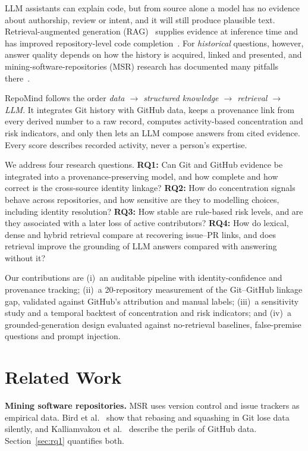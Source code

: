 \documentclass[conference]{IEEEtran}
\newcommand{\res}[1]{#1}
\begin{document}
LLM assistants can explain code, but from source alone a model has no evidence about authorship, review or intent, and it will still produce plausible text. Retrieval-augmented generation (RAG)~\cite{lewis2020rag} supplies evidence at inference time and has improved repository-level code completion~\cite{zhang2023repocoder}. For \emph{historical} questions, however, answer quality depends on how the history is acquired, linked and presented, and mining-software-repositories (MSR) research has documented many pitfalls there~\cite{bird2009perils,kalliamvakou2014promises}.

RepoMind follows the order \emph{data $\rightarrow$ structured knowledge $\rightarrow$ retrieval $\rightarrow$ LLM}. It integrates Git history with GitHub data, keeps a provenance link from every derived number to a raw record, computes activity-based concentration and risk indicators, and only then lets an LLM compose answers from cited evidence. Every score describes recorded activity, never a person's expertise.

We address four research questions. \textbf{RQ1:} Can Git and GitHub evidence be integrated into a provenance-preserving model, and how complete and how correct is the cross-source identity linkage? \textbf{RQ2:} How do concentration signals behave across repositories, and how sensitive are they to modelling choices, including identity resolution? \textbf{RQ3:} How stable are rule-based risk levels, and are they associated with a later loss of active contributors? \textbf{RQ4:} How do lexical, dense and hybrid retrieval compare at recovering issue--PR links, and does retrieval improve the grounding of LLM answers compared with answering without it?

Our contributions are (i)~an auditable pipeline with identity-confidence and provenance tracking; (ii)~a \res{20}-repository measurement of the Git--GitHub linkage gap, validated against GitHub's attribution and manual labels; (iii)~a sensitivity study and a temporal backtest of concentration and risk indicators; and (iv)~a grounded-generation design evaluated against no-retrieval baselines, false-premise questions and prompt injection.

\section{Related Work}
\textbf{Mining software repositories.} MSR uses version control and issue trackers as empirical data. Bird et al.~\cite{bird2009perils} show that rebasing and squashing in Git lose data silently, and Kalliamvakou et al.~\cite{kalliamvakou2014promises} describe the perils of GitHub data. Section~\ref{sec:rq1} quantifies both.
\end{document}
